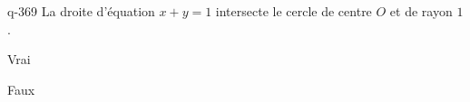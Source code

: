 \begin{truefalse}{q-369}
La droite d'équation $x+y=1$ intersecte le cercle de centre $O$ et de rayon $1$.
\item* Vrai
\item Faux
\end{truefalse}

